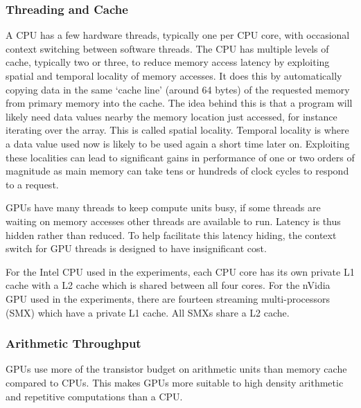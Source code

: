 \subsubsection{Threading and Cache}

A CPU has a few hardware threads, typically one per CPU core, with occasional
context switching between software threads. The CPU has multiple levels of
cache, typically two or three, to reduce memory access latency by exploiting
spatial and temporal locality of memory accesses. It does this by automatically
copying data in the same `cache line' (around 64 bytes) of the requested memory
from primary memory into the cache. The idea behind this is that a program will
likely need data values nearby the memory location just accessed, for instance
iterating over the array. This is called spatial locality. Temporal locality is
where a data value used now is likely to be used again a short time later on.
Exploiting these localities can lead to significant gains in performance of one
or two orders of magnitude as main memory can take tens or hundreds of clock
cycles to respond to a request.

GPUs have many threads to keep compute units busy, if some threads are waiting
on memory accesses other threads are available to run. Latency is thus hidden
rather than reduced. To help facilitate this latency hiding, the context switch
for GPU threads is designed to have insignificant cost.

For the Intel CPU used in the experiments, each CPU core has its own private L1
cache with a L2 cache which is shared between all four cores. For the nVidia GPU
used in the experiments, there are fourteen streaming multi-processors (SMX)
which have a private L1 cache. All SMXs share a L2 cache.

\subsubsection{Arithmetic Throughput}

GPUs use more of the transistor budget on arithmetic units than memory cache
compared to CPUs. This makes GPUs more suitable to high density arithmetic and
repetitive computations than a CPU.

